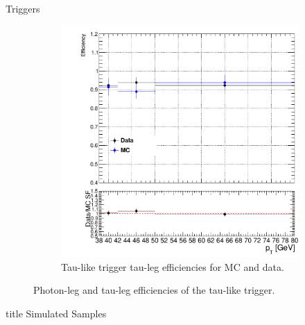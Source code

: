 \documentclass[9pt,aspectratio=1610]{beamer}
\begin{document}
\begin{frame}{Triggers}
\begin{itemize}
\begin{figure}
\begin{subfigure}{0.45\linewidth}
				\includegraphics[width=\textwidth]{figures/misc/tau_trigger_two_prong_efficiencies.pdf}
				\vspace{-2em}
				\caption{Tau-like trigger tau-leg efficiencies for MC and data.}
			\end{subfigure}
			\vspace{-1em}
		\caption{Photon-leg and tau-leg efficiencies of the tau-like trigger.}
		\end{figure}
	\end{itemize}
\end{frame}

\begin{frame}
	\vfill
	\centering
	\begin{beamercolorbox}[sep=8pt,center,shadow=false,rounded=true]{title}
		\Huge Simulated Samples \par%
	\end{beamercolorbox}
	\vfill
\end{frame}
\end{document}
